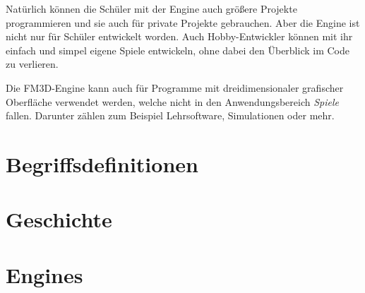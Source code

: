 Natürlich können die Schüler mit der Engine auch größere Projekte programmieren und sie auch für private Projekte gebrauchen. Aber die Engine ist nicht nur für Schüler entwickelt worden. Auch Hobby-Entwickler können mit ihr einfach und simpel eigene Spiele entwickeln, ohne dabei den Überblick im Code zu verlieren.

Die FM3D-Engine kann auch für Programme mit dreidimensionaler grafischer Oberfläche verwendet werden, welche nicht in den Anwendungsbereich \textit{Spiele} fallen. Darunter zählen zum Beispiel Lehrsoftware, Simulationen oder mehr.

\section{Begriffsdefinitionen}




\section{Geschichte}



\section{Engines}
\label{engines}


